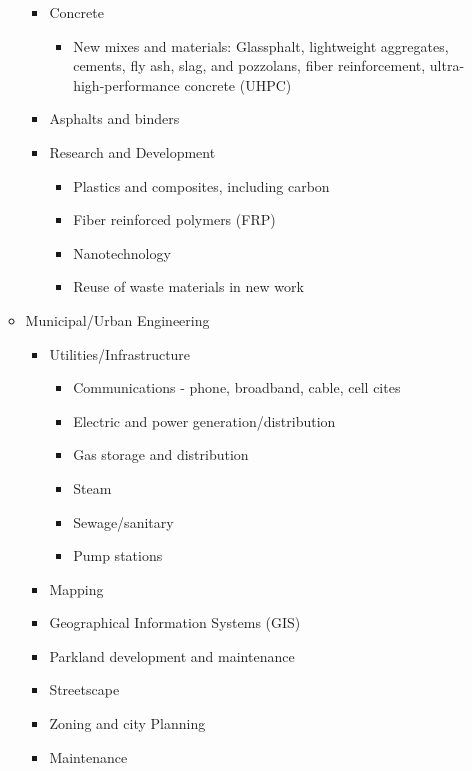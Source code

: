 \documentclass{article}
\begin{document}
\begin{itemize}
\begin{itemize}
\begin{itemize}
\begin{itemize}
            \end{itemize}
            \item Concrete
            \begin{itemize}
                \item New mixes and materials: Glassphalt, lightweight aggregates, cements, fly ash, slag, and pozzolans, fiber reinforcement, ultra-high-performance concrete (UHPC)
            \end{itemize}
            \item Asphalts and binders
            \item Research and Development
            \begin{itemize}
                \item Plastics and composites, including carbon
                \item Fiber reinforced polymers (FRP)
                \item Nanotechnology
                \item Reuse of waste materials in new work
            \end{itemize}
        \end{itemize}
        \item Municipal/Urban Engineering
        \begin{itemize}
            \item Utilities/Infrastructure
            \begin{itemize}
                \item Communications - phone, broadband, cable, cell cites
                \item Electric and power generation/distribution
                \item Gas storage and distribution
                \item Steam
                \item Sewage/sanitary
                \item Pump stations
            \end{itemize}
            \item Mapping
            \item Geographical Information Systems (GIS)
            \item Parkland development and maintenance
            \item Streetscape
            \item Zoning and city Planning
            \item Maintenance
        \end{itemize}

\end{itemize}
\end{itemize}
\end{document}
